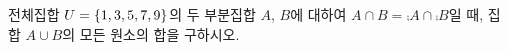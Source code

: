 전체집합 $U=\{1{,}\mkern3mu\mathopen{}3{,}\mkern3mu\mathopen{}5{,}\mkern3mu\mathopen{}7{,}\mkern3mu\mathopen{}9\}$의 두 부분집합 $A$, $B$에 대하여 $A\cap B=\comp{A}\cap\comp{B}$일 때, 집합 $A\cup B$의 모든 원소의 합을 구하시오.

